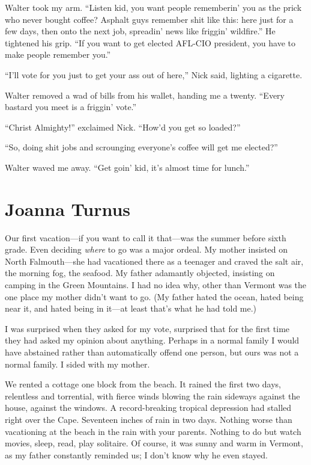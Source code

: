Walter took my arm. ``Listen kid, you want people rememberin' you as the
prick who never bought coffee? Asphalt guys remember shit like this:
here just for a few days, then onto the next job, spreadin' news like
friggin' wildfire.'' He tightened his grip. ``If you want to get elected
AFL-CIO president, you have to make people remember you.''

``I'll vote for you just to get your ass out of here,'' Nick said,
lighting a cigarette.

Walter removed a wad of bills from his wallet, handing me a twenty.
``Every bastard you meet is a friggin' vote.''

``Christ Almighty!'' exclaimed Nick. ``How'd you get so loaded?''

``So, doing shit jobs and scrounging everyone's coffee will get me
elected?''

Walter waved me away. ``Get goin' kid, it's almost time for lunch.''

\chapter{Joanna Turnus}

\titlemark

Our first vacation---if you want to call it that---was the summer before
sixth grade. Even deciding \emph{where} to go was a major ordeal. My
mother insisted on North Falmouth---she had vacationed there as a
teenager and craved the salt air, the morning fog, the seafood. My
father adamantly objected, insisting on camping in the Green Mountains.
I had no idea why, other than Vermont was the one place my mother didn't
want to go. (My father hated the ocean, hated being near it, and hated
being in it---at least that's what he had told me.)

I was surprised when they asked for my vote, surprised that for the
first time they had asked my opinion about anything. Perhaps in a normal
family I would have abstained rather than automatically offend one
person, but ours was not a normal family. I sided with my mother.

We rented a cottage one block from the beach. It rained the first two
days, relentless and torrential, with fierce winds blowing the rain
sideways against the house, against the windows. A record-breaking
tropical depression had stalled right over the Cape. Seventeen inches of
rain in two days. Nothing worse than vacationing at the beach in the
rain with your parents. Nothing to do but watch movies, sleep, read,
play solitaire. Of course, it was sunny and warm in Vermont, as my
father constantly reminded us; I don't know why he even stayed.

